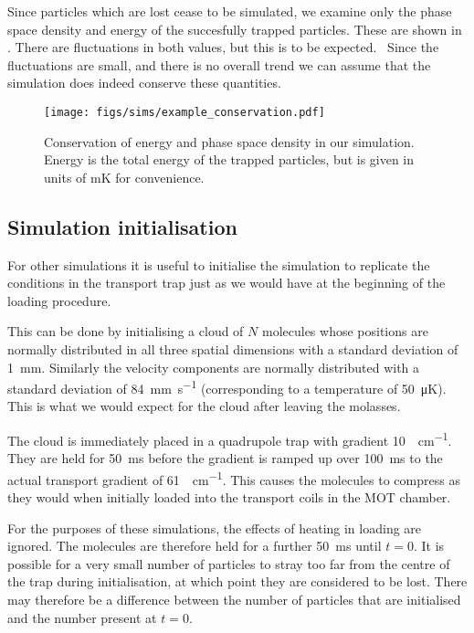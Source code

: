 Since particles which are lost cease to be simulated, we examine only the phase
space density and energy of the succesfully trapped particles. These are shown
in . There are fluctuations in both
values, but this is to be expected.~\cite{doi:10.1119/1.2034523} Since the
fluctuations are small, and there is no overall trend we can assume that the
simulation does indeed conserve these quantities.

\begin{figure}
  \centering
  \texttt{[image: figs/sims/example\_conservation.pdf]}
  \caption{Conservation of energy and phase space density in our simulation.
  Energy is the total energy of the trapped particles, but is given in units of
  \si{\milli\kelvin} for convenience.
  }
  \label{design:fig:conservation}
\end{figure}

\subsection{Simulation initialisation}

For other simulations it is useful to initialise the simulation to replicate
the conditions in the transport trap just as we would have at the beginning of
the loading procedure.

This can be done by initialising a cloud of $N$ molecules whose positions are
normally distributed in all three spatial dimensions with a standard deviation
of \SI{1}{\milli\meter}. Similarly the velocity components are normally
distributed with a standard deviation of \SI{84}{\milli\meter\per\second}
(corresponding to a temperature of \SI{50}{\micro\kelvin}). This is what we
would expect for the cloud after leaving the molasses.

The cloud is immediately placed in a quadrupole trap with gradient
\SI{10}{\gauss\per\centi\meter}. They are held for \SI{50}{\milli\second}
before the gradient is ramped up over \SI{100}{\milli\second} to the actual
transport gradient of \SI{61}{\gauss\per\centi\meter}. This causes the
molecules to compress as they would when initially loaded into the transport
coils in the MOT chamber.

For the purposes of these simulations, the effects of heating in loading are
ignored. The molecules are therefore held for a further \SI{50}{\milli\second}
until $t=0$. It is possible for a very small number of particles to stray too
far from the centre of the trap during initialisation, at which point they are
considered to be lost. There may therefore be a difference between the number
of particles that are initialised and the number present at $t=0$.

